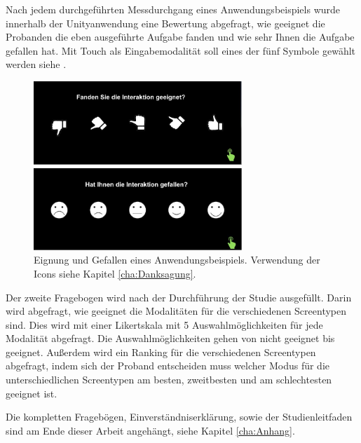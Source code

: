 Nach jedem durchgeführten Messdurchgang eines Anwendungsbeispiels wurde innerhalb der Unityanwendung eine Bewertung abgefragt, wie geeignet die Probanden die eben ausgeführte Aufgabe fanden und wie sehr Ihnen die Aufgabe gefallen hat. 
Mit Touch als Eingabemodalität soll eines der fünf Symbole gewählt werden siehe .
\begin{figure}
	\centering
		\includegraphics[width=0.7\textwidth]{img/Smileys.JPG}
	\caption[Eignung und Gefallen eines Anwendungsbeispiels]{Eignung und Gefallen eines Anwendungsbeispiels. Verwendung der Icons siehe Kapitel \ref{cha:Danksagung}.
}
	\label{fig:Smileys}
\end{figure}

Der zweite Fragebogen wird nach der Durchführung der Studie ausgefüllt. 
Darin wird abgefragt, wie geeignet die Modalitäten für die verschiedenen Screentypen sind. 
Dies wird mit einer Likertskala mit 5 Auswahlmöglichkeiten für jede Modalität abgefragt.  
Die Auswahlmöglichkeiten gehen von nicht geeignet bis geeignet. 
Außerdem wird ein Ranking für die verschiedenen Screentypen abgefragt, indem sich der Proband entscheiden muss welcher Modus für die unterschiedlichen Screentypen am besten, zweitbesten und am schlechtesten geeignet ist.  

Die kompletten Fragebögen, Einverständniserklärung, sowie der Studienleitfaden sind am Ende dieser Arbeit angehängt, siehe Kapitel \ref{cha:Anhang}.

